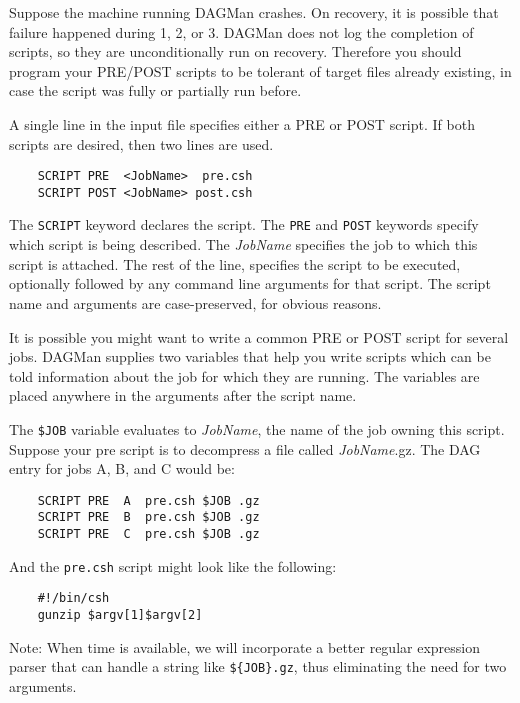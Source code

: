 \begin{description}
Suppose the machine running DAGMan crashes.  On recovery, it is possible that
failure happened during 1, 2, or 3.  DAGMan does not log the completion of
scripts, so they are unconditionally run on recovery.  Therefore you should
program your PRE/POST scripts to be tolerant of target files already existing,
in case the script was fully or partially run before.

A single line in the input file specifies either a PRE or POST script.  If
both scripts are desired, then two lines are used.

\begin{verbatim}
	SCRIPT PRE  <JobName>  pre.csh
	SCRIPT POST <JobName> post.csh
\end{verbatim}

The \texttt{SCRIPT} keyword declares the script.  The \texttt{PRE} and
\texttt{POST} keywords specify which script is being described.  The
\textit{JobName} specifies the job to which this script is attached.  The rest
of the line, specifies the script to be executed, optionally followed by any
command line arguments for that script.  The script name and arguments are
case-preserved, for obvious reasons.

It is possible you might want to write a common PRE or POST script for several
jobs.  DAGMan supplies two variables that help you write scripts which can be
told information about the job for which they are running.  The variables are
placed anywhere in the arguments after the script name.

The \texttt{\$JOB} variable evaluates to \textit{JobName}, the name of the job
owning this script.  Suppose your pre script is to decompress a file called
\textit{JobName}.gz.  The DAG entry for jobs A, B, and C would be:

\begin{verbatim}
	SCRIPT PRE  A  pre.csh $JOB .gz
	SCRIPT PRE  B  pre.csh $JOB .gz
	SCRIPT PRE  C  pre.csh $JOB .gz
\end{verbatim}

And the \texttt{pre.csh} script might look like the following:

\begin{verbatim}
	#!/bin/csh
	gunzip $argv[1]$argv[2]
\end{verbatim}

Note: When time is available, we will incorporate a better regular
expression parser that can handle a string like \texttt{\$\{JOB\}.gz}, thus
eliminating the need for two arguments.


\end{description}
